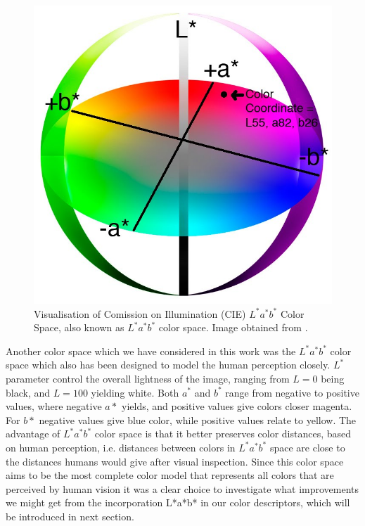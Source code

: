 \documentclass{report}
\begin{document}
\begin{figure}[hbtp]
\centering
\caption{Visualisation of Comission on Illumination (CIE) $L^*a^*b^*$ Color Space, also known as $L^*a^*b^*$ color space. Image obtained from \cite{lab_blogspot}.}
\includegraphics[scale=0.2]{graphics/lab_space.jpg}
\end{figure}


Another color space which we have considered in this work was the $L^*a^*b^*$ color space which also has been designed to model the human perception closely. $L^*$ parameter control the overall lightness of the image, ranging from $L=0$ being black, and $L=100$ yielding white. Both $a^*$ and $b^*$ range from negative to positive values, where negative $a*$ yields, and positive values give colors closer magenta. For $b*$ negative values give blue color, while positive values relate to yellow. The advantage of $L^*a^*b^*$ color space is that it better preserves color distances, based on human perception, i.e. distances between colors in $L^*a^*b^*$ space are close to the distances humans would give after visual inspection. Since this color space aims to be the most complete color model that represents all colors that are perceived by human vision it was a clear choice to investigate what improvements we might get from the incorporation L*a*b* in our color descriptors, which will be introduced in next section.
\end{document}
